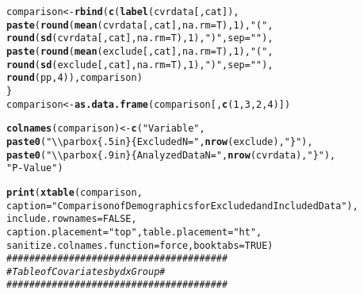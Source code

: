 \documentclass[10pt]{article}\usepackage[]{graphicx}\usepackage[]{color}
\makeatletter
\newcommand{\hlnum}[1]{\textcolor[rgb]{0.686,0.059,0.569}{#1}}%
\newcommand{\hlstr}[1]{\textcolor[rgb]{0.192,0.494,0.8}{#1}}%
\newcommand{\hlcom}[1]{\textcolor[rgb]{0.678,0.584,0.686}{\textit{#1}}}%
\newcommand{\hlstd}[1]{\textcolor[rgb]{0.345,0.345,0.345}{#1}}%
\newcommand{\hlkwb}[1]{\textcolor[rgb]{0.69,0.353,0.396}{#1}}%
\newcommand{\hlkwc}[1]{\textcolor[rgb]{0.333,0.667,0.333}{#1}}%
\newcommand{\hlkwd}[1]{\textcolor[rgb]{0.737,0.353,0.396}{\textbf{#1}}}%
\newenvironment{kframe}{%
 \def\at@end@of@kframe{}%
 \ifinner\ifhmode%
  \def\at@end@of@kframe{\end{minipage}}%
  \begin{minipage}{\columnwidth}%
 \fi\fi%
 \def\FrameCommand##1{\hskip\@totalleftmargin \hskip-\fboxsep
 \colorbox{shadecolor}{##1}\hskip-\fboxsep
     \hskip-\linewidth \hskip-\@totalleftmargin \hskip\columnwidth}%
 \MakeFramed {\advance\hsize-\width
   \@totalleftmargin\z@ \linewidth\hsize
   \@setminipage}}%
 {\par\unskip\endMakeFramed%
 \at@end@of@kframe}
\newenvironment{knitrout}{}{} %
\makeatother
\begin{document}
\begin{knitrout}
\begin{kframe}
\begin{alltt}
  \hlstd{comparison} \hlkwb{<-} \hlkwd{rbind}\hlstd{(}\hlkwd{c}\hlstd{(}\hlkwd{label}\hlstd{(cvrdata[,cat]),}
                \hlkwd{paste}\hlstd{(}\hlkwd{round}\hlstd{(}\hlkwd{mean}\hlstd{(cvrdata[,cat],} \hlkwc{na.rm}\hlstd{=T),}\hlnum{1}\hlstd{),}\hlstr{" ("}\hlstd{,}
                      \hlkwd{round}\hlstd{(}\hlkwd{sd}\hlstd{(cvrdata[,cat],}\hlkwc{na.rm}\hlstd{=T),}\hlnum{1}\hlstd{),} \hlstr{")"}\hlstd{,}\hlkwc{sep}\hlstd{=}\hlstr{""}\hlstd{),}
                \hlkwd{paste}\hlstd{(}\hlkwd{round}\hlstd{(}\hlkwd{mean}\hlstd{(exclude[,cat],} \hlkwc{na.rm}\hlstd{=T),}\hlnum{1}\hlstd{),}\hlstr{" ("}\hlstd{,}
                      \hlkwd{round}\hlstd{(}\hlkwd{sd}\hlstd{(exclude[,cat],}\hlkwc{na.rm}\hlstd{=T),}\hlnum{1}\hlstd{),} \hlstr{")"}\hlstd{,}\hlkwc{sep}\hlstd{=}\hlstr{""}\hlstd{),}
                \hlkwd{round}\hlstd{(pp,}\hlnum{4}\hlstd{)), comparison)}
\hlstd{\}}
\hlstd{comparison} \hlkwb{<-} \hlkwd{as.data.frame}\hlstd{(comparison[,}\hlkwd{c}\hlstd{(}\hlnum{1}\hlstd{,}\hlnum{3}\hlstd{,}\hlnum{2}\hlstd{,}\hlnum{4}\hlstd{)])}

\hlkwd{colnames}\hlstd{(comparison)} \hlkwb{<-} \hlkwd{c}\hlstd{(}\hlstr{"Variable"}\hlstd{,}
                             \hlkwd{paste0}\hlstd{(}\hlstr{"\textbackslash{}\textbackslash{}parbox\{.5in\}\{Excluded N="}\hlstd{,} \hlkwd{nrow}\hlstd{(exclude),} \hlstr{"\}"}\hlstd{),}
                             \hlkwd{paste0}\hlstd{(}\hlstr{"\textbackslash{}\textbackslash{}parbox\{.9in\}\{Analyzed Data N="}\hlstd{,} \hlkwd{nrow}\hlstd{(cvrdata),} \hlstr{"\}"}\hlstd{),}
                             \hlstr{"P-Value"}\hlstd{)}

\hlkwd{print}\hlstd{(}\hlkwd{xtable}\hlstd{(comparison,}
      \hlkwc{caption}\hlstd{=}\hlstr{"Comparison of Demographics for Excluded and Included Data"}\hlstd{),}
      \hlkwc{include.rownames} \hlstd{=} \hlnum{FALSE}\hlstd{,}
      \hlkwc{caption.placement} \hlstd{=} \hlstr{"top"}\hlstd{,} \hlkwc{table.placement} \hlstd{=} \hlstr{"ht"}\hlstd{,}
      \hlkwc{sanitize.colnames.function} \hlstd{= force,} \hlkwc{booktabs} \hlstd{=} \hlnum{TRUE}\hlstd{)}
\hlcom{#######################################}
\hlcom{#  Table of Covariates by dx Group    #}
\hlcom{#######################################}


\end{alltt}
\end{kframe}
\end{knitrout}
\end{document}
